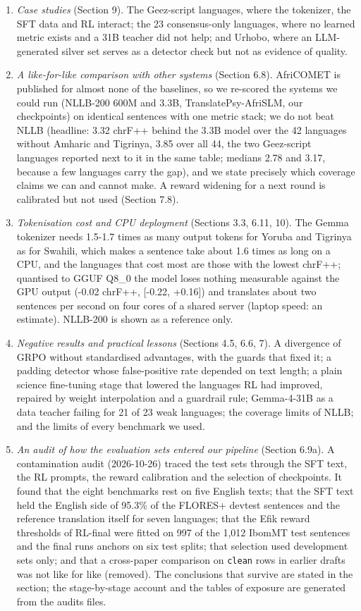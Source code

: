 \begin{enumerate}
\item
  \emph{Case studies} (Section 9). The Ge\textquotesingle ez-script languages, where the tokenizer, the SFT data and RL interact; the 23 consensus-only languages, where no learned metric exists and a 31B teacher did not help; and Urhobo, where an LLM-generated silver set serves as a detector check but not as evidence of quality.
\item
  \emph{A like-for-like comparison with other systems} (Section 6.8). AfriCOMET is published for almost none of the baselines, so we re-scored the systems we could run (NLLB-200 600M and 3.3B, TranslatePsy-AfriSLM, our checkpoints) on identical sentences with one metric stack; we do not beat NLLB (headline: 3.32 chrF++ behind the 3.3B model over the 42 languages without Amharic and Tigrinya, 3.85 over all 44, the two Ge\textquotesingle ez-script languages reported next to it in the same table; medians 2.78 and 3.17, because a few languages carry the gap), and we state precisely which coverage claims we can and cannot make. A reward widening for a next round is calibrated but not used (Section 7.8).
\item
  \emph{Tokenisation cost and CPU deployment} (Sections 3.3, 6.11, 10). The Gemma tokenizer needs 1.5-1.7 times as many output tokens for Yoruba and Tigrinya as for Swahili, which makes a sentence take about 1.6 times as long on a CPU, and the languages that cost most are those with the lowest chrF++; quantised to GGUF Q8\_0 the model loses nothing measurable against the GPU output (-0.02 chrF++, {[}-0.22, +0.16{]}) and translates about two sentences per second on four cores of a shared server (laptop speed: an estimate). NLLB-200 is shown as a reference only.
\item
  \emph{Negative results and practical lessons} (Sections 4.5, 6.6, 7). A divergence of GRPO without standardised advantages, with the guards that fixed it; a padding detector whose false-positive rate depended on text length; a plain science fine-tuning stage that lowered the languages RL had improved, repaired by weight interpolation and a guardrail rule; Gemma-4-31B as a data teacher failing for 21 of 23 weak languages; the coverage limits of NLLB; and the limits of every benchmark we used.
\item
  \emph{An audit of how the evaluation sets entered our pipeline} (Section 6.9a). A contamination audit (2026-10-26) traced the test sets through the SFT text, the RL prompts, the reward calibration and the selection of checkpoints. It found that the eight benchmarks rest on five English texts; that the SFT text held the English side of 95.3\% of the FLORES+ devtest sentences and the reference translation itself for seven languages; that the Efik reward thresholds of RL-final were fitted on 997 of the 1,012 IbomMT test sentences and the final run\textquotesingle s anchors on six test splits; that selection used development sets only; and that a cross-paper comparison on \texttt{clean} rows in earlier drafts was not like for like (removed). The conclusions that survive are stated in the section; the stage-by-stage account and the tables of exposure are generated from the audit\textquotesingle s files.
\end{enumerate}

